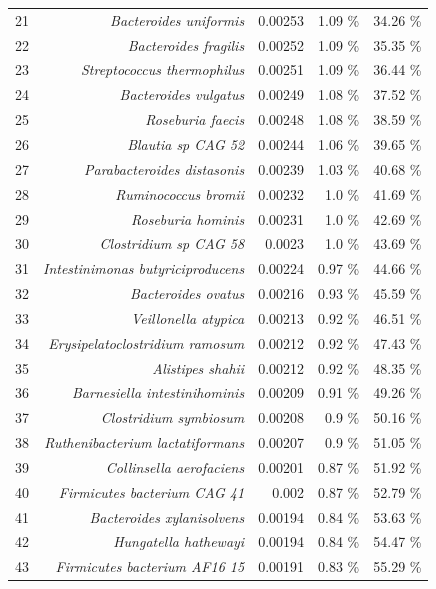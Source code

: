 \documentclass{article}
\begin{document}
\begin{table}
\begin{centering}
\begin{tabular}{|r|r|r|r|r|}
  21 & \textit{Bacteroides uniformis} & 0.00253 & 1.09 \% & 34.26 \% \\
  22 & \textit{Bacteroides fragilis} & 0.00252 & 1.09 \% & 35.35 \% \\
  23 & \textit{Streptococcus thermophilus} & 0.00251 & 1.09 \% & 36.44 \% \\
  24 & \textit{Bacteroides vulgatus} & 0.00249 & 1.08 \% & 37.52 \% \\
  25 & \textit{Roseburia faecis} & 0.00248 & 1.08 \% & 38.59 \% \\
  26 & \textit{Blautia sp CAG 52} & 0.00244 & 1.06 \% & 39.65 \% \\
  27 & \textit{Parabacteroides distasonis} & 0.00239 & 1.03 \% & 40.68 \% \\
  28 & \textit{Ruminococcus bromii} & 0.00232 & 1.0 \% & 41.69 \% \\
  29 & \textit{Roseburia hominis} & 0.00231 & 1.0 \% & 42.69 \% \\
  30 & \textit{Clostridium sp CAG 58} & 0.0023 & 1.0 \% & 43.69 \% \\
  31 & \textit{Intestinimonas butyriciproducens} & 0.00224 & 0.97 \% & 44.66 \% \\
  32 & \textit{Bacteroides ovatus} & 0.00216 & 0.93 \% & 45.59 \% \\
  33 & \textit{Veillonella atypica} & 0.00213 & 0.92 \% & 46.51 \% \\
  34 & \textit{Erysipelatoclostridium ramosum} & 0.00212 & 0.92 \% & 47.43 \% \\
  35 & \textit{Alistipes shahii} & 0.00212 & 0.92 \% & 48.35 \% \\
  36 & \textit{Barnesiella intestinihominis} & 0.00209 & 0.91 \% & 49.26 \% \\
  37 & \textit{Clostridium symbiosum} & 0.00208 & 0.9 \% & 50.16 \% \\
  38 & \textit{Ruthenibacterium lactatiformans} & 0.00207 & 0.9 \% & 51.05 \% \\
  39 & \textit{Collinsella aerofaciens} & 0.00201 & 0.87 \% & 51.92 \% \\
  40 & \textit{Firmicutes bacterium CAG 41} & 0.002 & 0.87 \% & 52.79 \% \\
  41 & \textit{Bacteroides xylanisolvens} & 0.00194 & 0.84 \% & 53.63 \% \\
  42 & \textit{Hungatella hathewayi} & 0.00194 & 0.84 \% & 54.47 \% \\
  43 & \textit{Firmicutes bacterium AF16 15} & 0.00191 & 0.83 \% & 55.29 \% \\

\end{tabular}
\end{centering}
\end{table}
\end{document}
